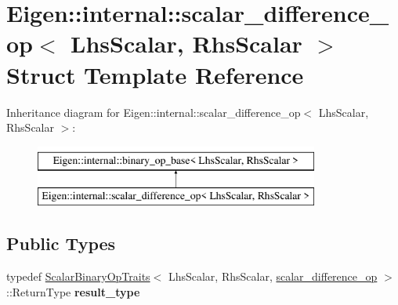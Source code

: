 \hypertarget{struct_eigen_1_1internal_1_1scalar__difference__op}{}\section{Eigen\+::internal\+::scalar\+\_\+difference\+\_\+op$<$ Lhs\+Scalar, Rhs\+Scalar $>$ Struct Template Reference}
\label{struct_eigen_1_1internal_1_1scalar__difference__op}
Inheritance diagram for Eigen\+::internal\+::scalar\+\_\+difference\+\_\+op$<$ Lhs\+Scalar, Rhs\+Scalar $>$\+:\begin{figure}[H]
\begin{center}
\leavevmode
\includegraphics[height=2.000000cm]{struct_eigen_1_1internal_1_1scalar__difference__op}
\end{center}
\end{figure}
\subsection*{Public Types}
\begin{DoxyCompactItemize}
\item 
\mbox{\label{struct_eigen_1_1internal_1_1scalar__difference__op_af12564e6db10e3e97d912c3263feae32}} 
typedef \mbox{\hyperlink{struct_eigen_1_1_scalar_binary_op_traits}{Scalar\+Binary\+Op\+Traits}}$<$ Lhs\+Scalar, Rhs\+Scalar, \mbox{\hyperlink{struct_eigen_1_1internal_1_1scalar__difference__op}{scalar\+\_\+difference\+\_\+op}} $>$\+::Return\+Type {\bfseries result\+\_\+type}
\end{DoxyCompactItemize}
